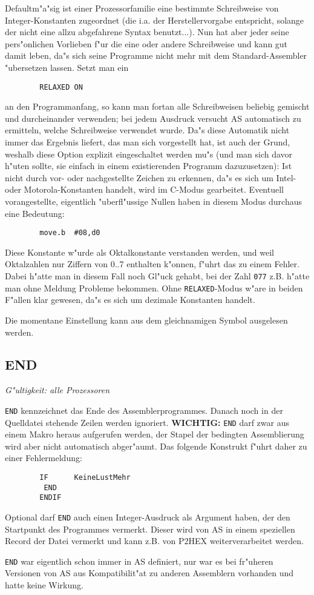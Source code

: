 \documentclass[12pt,a4paper,twoside]{report}
\makeatletter
\newcommand{\bb}[1]{{\bf #1}}
\newcommand{\tty}[1]{{\tt #1}}
\newcommand{\ttindex}[1]{\index{#1@{\tt #1}}}
\makeatother
\begin{document}
Defaultm"a"sig ist einer Prozessorfamilie eine bestimmte Schreibweise
von Integer-Konstanten zugeordnet (die i.a. der Herstellervorgabe
entspricht, solange der nicht eine allzu abgefahrene Syntax benutzt...).
Nun hat aber jeder seine pers"onlichen Vorlieben f"ur die eine oder
andere Schreibweise und kann gut damit leben, da"s sich seine Programme
nicht mehr mit dem Standard-Assembler "ubersetzen lassen. Setzt man ein
\begin{verbatim}
        RELAXED ON
\end{verbatim}
an den Programmanfang, so kann man fortan alle Schreibweisen beliebig
gemischt und durcheinander verwenden; bei jedem Ausdruck versucht AS
automatisch zu ermitteln, welche Schreibweise verwendet wurde.  Da"s
diese Automatik nicht immer das Ergebnis liefert, das man sich vorgestellt
hat, ist auch der Grund, weshalb diese Option explizit eingeschaltet
werden mu"s (und man sich davor h"uten sollte, sie einfach in einem
existierenden Programm dazuzusetzen): Ist nicht durch vor- oder
nachgestellte Zeichen zu erkennen, da"s es sich um Intel- oder
Motorola-Konstanten handelt, wird im C-Modus gearbeitet.  Eventuell
vorangestellte, eigentlich "uberfl"ussige Nullen haben in diesem Modus
durchaus eine Bedeutung:
\begin{verbatim}
        move.b  #08,d0
\end{verbatim}
Diese Konstante w"urde als Oktalkonstante verstanden werden, und weil
Oktalzahlen nur Ziffern von 0..7 enthalten k"onnen, f"uhrt das zu einem
Fehler.  Dabei h"atte man in diesem Fall noch Gl"uck gehabt, bei der
Zahl \tty{077} z.B. h"atte man ohne Meldung Probleme bekommen.  Ohne
\tty{RELAXED}-Modus w"are in beiden F"allen klar gewesen, da"s es sich
um dezimale Konstanten handelt.
\par
Die momentane Einstellung kann aus dem gleichnamigen Symbol ausgelesen
werden.


\subsection{END}
\ttindex{END}

{\em G"ultigkeit: alle Prozessoren}

\tty{END} kennzeichnet das Ende des Assemblerprogrammes.  Danach
noch in der Quelldatei stehende Zeilen werden ignoriert.
\bb{WICHTIG:} \tty{END} darf zwar aus einem Makro heraus aufgerufen
werden, der Stapel der bedingten Assemblierung wird aber nicht
automatisch abger"aumt.  Das folgende Konstrukt f"uhrt daher zu
einer Fehlermeldung:
\begin{verbatim}
        IF      KeineLustMehr
         END
        ENDIF
\end{verbatim}
Optional darf \tty{END} auch einen Integer-Ausdruck als Argument haben,
der den Startpunkt des Programmes vermerkt.  Dieser wird von AS in einem
speziellen Record der Datei vermerkt und kann z.B. von P2HEX
weiterverarbeitet werden.
\par
\tty{END} war eigentlich schon immer in AS definiert, nur war es
bei fr"uheren Versionen von AS aus Kompatibilit"at zu anderen
Assemblern vorhanden und hatte keine Wirkung.
\end{document}
